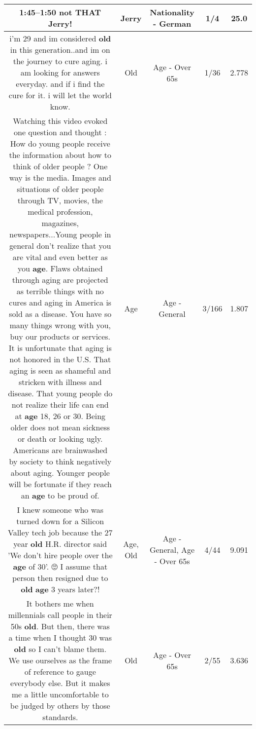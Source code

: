 \documentclass[11pt]{article}
\newlength\mylength
\begin{document}
\begin{center}
\begin{longtable}{|C{.65\mylength}|C{.30\mylength}|C{.12\mylength}|C{.12\mylength}|C{.12\mylength}|}
  \small \@1:45–1:50 not THAT \textbf{Jerry}!\normalsize   & Jerry & Nationality - German & 1/4 & 25.0 \\  \hline
  \small i'm 29  and im considered \textbf{old} in this generation..and im on the journey to cure aging. i am looking for  answers everyday. and if i find the cure for it. i will let the world know.\normalsize   & Old & Age - Over 65s & 1/36 & 2.778 \\  \hline
  \small Watching this video evoked one question and thought : How do young people receive the information about how to think of older people ? One way is the media. Images and situations of older people through TV, movies, the medical profession, magazines, newspapers...Young people in general don't realize that you are vital and even better as you \textbf{age}. Flaws obtained through aging are projected as terrible things  with no cures and aging in America is sold as a disease. You have so many things wrong with you, buy our products or services. It is unfortunate that aging is not honored in the U.S. That aging is seen as shameful and stricken with illness and disease. That young people do not realize their life can end at \textbf{age} 18, 26 or 30. Being older does not mean sickness or death or looking ugly. Americans are brainwashed by society to think negatively about aging. Younger people will be fortunate if they reach an \textbf{age} to be proud of.\normalsize   & Age & Age - General & 3/166 & 1.807 \\  \hline
  \small I knew someone who was turned down for a Silicon Valley tech job because the 27 year \textbf{old} H.R. director said 'We don't hire people over the \textbf{age} of 30'. 🙄 I assume that person then resigned due to \textbf{old} \textbf{age} 3 years later?!\normalsize   & Age, Old & Age - General, Age - Over 65s & 4/44 & 9.091 \\  \hline
  \small It bothers me when millennials call people in their 50s \textbf{old}. But then, there was a time when I thought 30 was \textbf{old} so I can't blame them. We use ourselves as the frame of reference to gauge everybody else. But it makes me a little uncomfortable to be judged by others by those standards.\normalsize   & Old & Age - Over 65s & 2/55 & 3.636 \\  \hline

\end{longtable}
\end{center}
\end{document}
